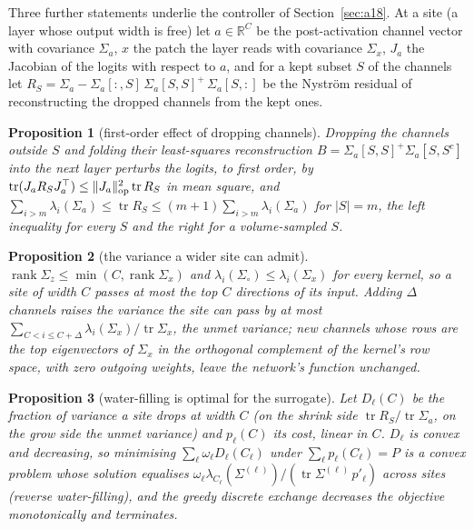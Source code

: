 \documentclass[10pt,journal,compsoc]{IEEEtran}
\newtheorem{proposition}{Proposition}
\begin{document}
Three further statements underlie the controller of Section~\ref{sec:a18}. At a site (a layer whose output width is free) let $a \in \mathbb{R}^{C}$ be the post-activation channel vector with covariance $\Sigma_a$, $x$ the patch the layer reads with covariance $\Sigma_x$, $J_a$ the Jacobian of the logits with respect to $a$, and for a kept subset $S$ of the channels let $R_S = \Sigma_a - \Sigma_a[:,S]\,\Sigma_a[S,S]^{+}\,\Sigma_a[S,:]$ be the Nystr\"om residual of reconstructing the dropped channels from the kept ones.

\begin{proposition}[first-order effect of dropping channels]
\label{prop:shrink}
Dropping the channels outside $S$ and folding their least-squares reconstruction $B = \Sigma_a[S,S]^{+}\Sigma_a[S,S^c]$ into the next layer perturbs the logits, to first order, by $\operatorname{tr}(J_a R_S J_a^{\top}) \le \|J_a\|_{\rm op}^2 \operatorname{tr} R_S$ in mean square, and
$\sum_{i > m} \lambda_i(\Sigma_a) \le \operatorname{tr} R_S \le (m+1) \sum_{i > m} \lambda_i(\Sigma_a)$ for $|S| = m$, the left inequality for every $S$ and the right for a volume-sampled $S$.
\end{proposition}

\begin{proposition}[the variance a wider site can admit]
\label{prop:grow}
$\operatorname{rank} \Sigma_z \le \min(C, \operatorname{rank} \Sigma_x)$ and $\lambda_i(\Sigma_{\circ}) \le \lambda_i(\Sigma_x)$ for every kernel, so a site of width $C$ passes at most the top $C$ directions of its input. Adding $\Delta$ channels raises the variance the site can pass by at most $\sum_{C < i \le C + \Delta} \lambda_i(\Sigma_x) / \operatorname{tr}\Sigma_x$, the \emph{unmet variance}; new channels whose rows are the top eigenvectors of $\Sigma_x$ in the orthogonal complement of the kernel's row space, with zero outgoing weights, leave the network's function unchanged.
\end{proposition}

\begin{proposition}[water-filling is optimal for the surrogate]
\label{prop:fill}
Let $D_\ell(C)$ be the fraction of variance a site drops at width $C$ (on the shrink side $\operatorname{tr} R_S / \operatorname{tr} \Sigma_a$, on the grow side the unmet variance) and $p_\ell(C)$ its cost, linear in $C$. $D_\ell$ is convex and decreasing, so minimising $\sum_\ell \omega_\ell D_\ell(C_\ell)$ under $\sum_\ell p_\ell(C_\ell) = P$ is a convex problem whose solution equalises $\omega_\ell \lambda_{C_\ell}(\Sigma^{(\ell)}) / (\operatorname{tr}\Sigma^{(\ell)}\, p'_\ell)$ across sites (reverse water-filling), and the greedy discrete exchange decreases the objective monotonically and terminates.
\end{proposition}
\end{document}
